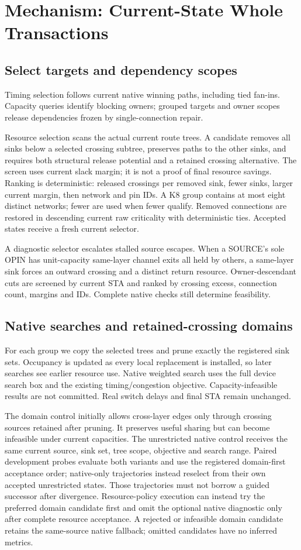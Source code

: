 \documentclass[conference,10pt]{IEEEtran}
\begin{document}
\section{Mechanism: Current-State Whole Transactions}
\subsection{Select targets and dependency scopes}
Timing selection follows current native winning paths, including tied fan-ins. Capacity queries identify blocking owners; grouped targets and owner scopes release dependencies frozen by single-connection repair.

Resource selection scans the actual current route trees. A candidate removes all sinks below a selected crossing subtree, preserves paths to the other sinks, and requires both structural release potential and a retained crossing alternative. The screen uses current slack margin; it is not a proof of final resource savings. Ranking is deterministic: released crossings per removed sink, fewer sinks, larger current margin, then network and pin IDs. A K8 group contains at most eight distinct networks; fewer are used when fewer qualify. Removed connections are restored in descending current raw criticality with deterministic ties. Accepted states receive a fresh current selector.

A diagnostic selector escalates stalled source escapes. When a SOURCE's sole OPIN has unit-capacity same-layer channel exits all held by others, a same-layer sink forces an outward crossing and a distinct return resource. Owner-descendant cuts are screened by current STA and ranked by crossing excess, connection count, margins and IDs. Complete native checks still determine feasibility.

\subsection{Native searches and retained-crossing domains}
For each group we copy the selected trees and prune exactly the registered sink sets. Occupancy is updated as every local replacement is installed, so later searches see earlier resource use. Native weighted search uses the full device search box and the existing timing/congestion objective. Capacity-infeasible results are not committed. Real switch delays and final STA remain unchanged.

The domain control initially allows cross-layer edges only through crossing sources retained after pruning. It preserves useful sharing but can become infeasible under current capacities. The unrestricted native control receives the same current source, sink set, tree scope, objective and search range. Paired development probes evaluate both variants and use the registered domain-first acceptance order; native-only trajectories instead reselect from their own accepted unrestricted states. Those trajectories must not borrow a guided successor after divergence. Resource-policy execution can instead try the preferred domain candidate first and omit the optional native diagnostic only after complete resource acceptance. A rejected or infeasible domain candidate retains the same-source native fallback; omitted candidates have no inferred metrics.
\end{document}
